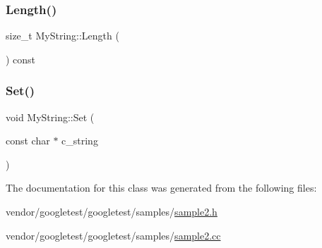 \subsubsection{\texorpdfstring{Length()}{Length()}}
{\footnotesize\ttfamily size\+\_\+t My\+String\+::\+Length (\begin{DoxyParamCaption}{ }\end{DoxyParamCaption}) const\hspace{0.3cm}{\ttfamily [inline]}}

\mbox{\label{class_my_string_a521c4cd7eccac6ce554d8a51505e4970}} 
\subsubsection{\texorpdfstring{Set()}{Set()}}
{\footnotesize\ttfamily void My\+String\+::\+Set (\begin{DoxyParamCaption}\item[{const char $\ast$}]{c\+\_\+string }\end{DoxyParamCaption})}



The documentation for this class was generated from the following files\+:\begin{DoxyCompactItemize}
\item 
vendor/googletest/googletest/samples/\hyperlink{sample2_8h}{sample2.\+h}\item 
vendor/googletest/googletest/samples/\hyperlink{sample2_8cc}{sample2.\+cc}\end{DoxyCompactItemize}
